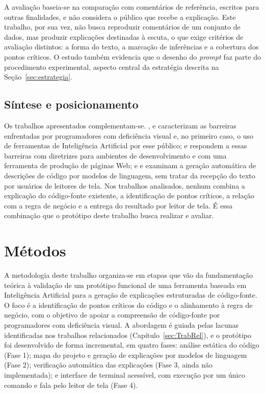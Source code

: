 \documentclass[
    12pt,                   %
    openright,              %
    oneside,                %
    a4paper,                %
    sumario=tradicional,    %
    english,                %
    brazil,                 %
    ]{abntex2}
\begin{document}
A avaliação baseia-se na comparação com comentários de referência, escritos para outras finalidades, e não considera o público que recebe a explicação. Este trabalho, por sua vez, não busca reproduzir comentários de um conjunto de dados, mas produzir explicações destinadas à escuta, o que exige critérios de avaliação distintos: a forma do texto, a marcação de inferências e a cobertura dos pontos críticos. O estudo também evidencia que o desenho do \textit{prompt} faz parte do procedimento experimental, aspecto central da estratégia descrita na Seção~\ref{sec:estrategia}.

\section{Síntese e posicionamento}

Os trabalhos apresentados complementam-se. \textcite{latinoware34224}, \textcite{latinoware20457} e \textcite{acad54431201} caracterizam as barreiras enfrentadas por programadores com deficiência visual e, no primeiro caso, o uso de ferramentas de Inteligência Artificial por esse público; \textcite{latinoware37693} e \textcite{latinoware40920} respondem a essas barreiras com diretrizes para ambientes de desenvolvimento e com uma ferramenta de produção de páginas Web; e \textcite{sun2023chatgptsum} e \textcite{hou2024llmse} examinam a geração automática de descrições de código por modelos de linguagem, sem tratar da recepção do texto por usuários de leitores de tela. Nos trabalhos analisados, nenhum combina a explicação do código-fonte existente, a identificação de pontos críticos, a relação com a regra de negócio e a entrega do resultado por leitor de tela. É essa combinação que o protótipo deste trabalho busca realizar e avaliar.



\chapter{Métodos}\label{sec:metodos}

A metodologia deste trabalho organiza-se em etapas que vão da fundamentação teórica à validação de um protótipo funcional de uma ferramenta baseada em Inteligência Artificial para a geração de explicações estruturadas de código-fonte. O foco é a identificação de pontos críticos do código e o alinhamento à regra de negócio, com o objetivo de apoiar a compreensão de código-fonte por programadores com deficiência visual. A abordagem é guiada pelas lacunas identificadas nos trabalhos relacionados (Capítulo~\ref{sec:TrabRel}), e o protótipo foi desenvolvido de forma incremental, em quatro fases: análise estática do código (Fase 1); mapa do projeto e geração de explicações por modelos de linguagem (Fase 2); verificação automática das explicações (Fase 3, ainda não implementada); e interface de terminal acessível, com execução por um único comando e fala pelo leitor de tela (Fase 4).
\end{document}
